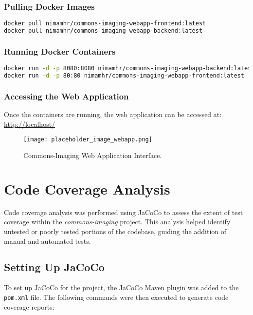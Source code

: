 \documentclass[a4paper,12pt]{report}
\begin{document}
\subsection{Pulling Docker Images}
\begin{lstlisting}[language=bash, caption=Pull Docker Images from DockerHub]
docker pull nimamhr/commons-imaging-webapp-frontend:latest
docker pull nimamhr/commons-imaging-webapp-backend:latest
\end{lstlisting}

\subsection{Running Docker Containers}
\begin{lstlisting}[language=bash, caption=Run Docker Containers]
docker run -d -p 8080:8080 nimamhr/commons-imaging-webapp-backend:latest
docker run -d -p 80:80 nimamhr/commons-imaging-webapp-frontend:latest
\end{lstlisting}

\subsection{Accessing the Web Application}
Once the containers are running, the web application can be accessed at:\\
\url{http://localhost/}

\begin{figure}[H]
    \centering
    \texttt{[image: placeholder\_image\_webapp.png]} %
    \caption{Commons-Imaging Web Application Interface.}
    \label{fig:webapp_interface}
\end{figure}


\chapter{Code Coverage Analysis}
Code coverage analysis was performed using JaCoCo to assess the extent of test coverage within the \textit{commons-imaging} project. This analysis helped identify untested or poorly tested portions of the codebase, guiding the addition of manual and automated tests.

\section{Setting Up JaCoCo}
To set up JaCoCo for the project, the JaCoCo Maven plugin was added to the \texttt{pom.xml} file. The following commands were then executed to generate code coverage reports:
\end{document}

